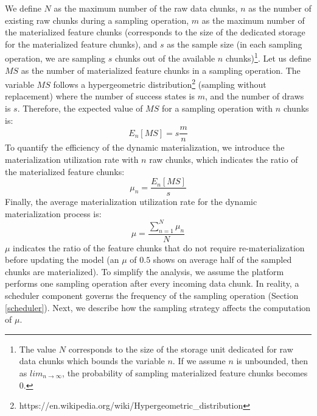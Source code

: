 We define $N$ as the maximum number of the raw data chunks, $n$ as the number of existing raw chunks during a sampling operation, $m$ as the maximum number of the materialized feature chunks (corresponds to the size of the dedicated storage for the materialized feature chunks), and $s$ as the sample size (in each sampling operation, we are sampling $s$ chunks out of the available $n$ chunks)\footnote{The value $N$ corresponds to the size of the storage unit dedicated for raw data chunks which bounds the variable $n$. If we assume $n$ is unbounded, then as $lim_{n\to\infty}$, the probability of sampling materialized feature chunks becomes $0$.}.
Let us define $MS$ as the number of materialized feature chunks in a sampling operation.
The variable $MS$ follows a hypergeometric distribution\footnote{https://en.wikipedia.org/wiki/Hypergeometric\_distribution} (sampling without replacement) where the number of success states is $m$, and the number of draws is $s$.
Therefore, the expected value of $MS$ for a sampling operation with $n$ chunks is:
\begin{equation*}
E_n[MS] = s\dfrac{m}{n}
\end{equation*}
To quantify the efficiency of the dynamic materialization, we introduce the materialization utilization rate with $n$ raw chunks, which indicates the ratio of the materialized feature chunks:
\begin{equation*}   
 \mu_n=  \dfrac{E_n[MS]}{s}
\end{equation*}
Finally, the average materialization utilization rate for the dynamic materialization process is:
\begin{equation}  \label{formula-mu}
\mu = \dfrac{\sum_{n=1}^N \mu_n}{N}
\end{equation}
$\mu$ indicates the ratio of the feature chunks that do not require re-materialization before updating the model (an $\mu$ of $0.5$ shows on average half of the sampled chunks are materialized).
To simplify the analysis, we assume the platform performs one sampling operation after every incoming data chunk. 
In reality, a scheduler component governs the frequency of the sampling operation (Section \ref{scheduler}).
Next, we describe how the sampling strategy affects the computation of $\mu$.

